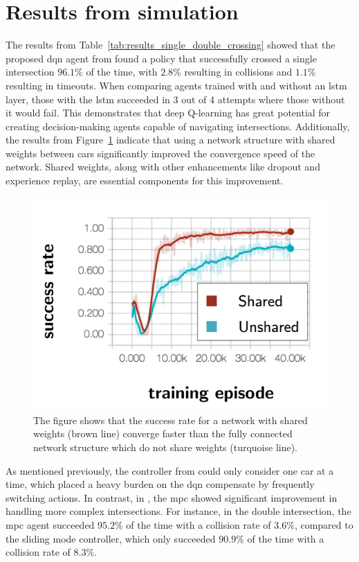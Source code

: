 \section{Results from simulation}
\label{sec:results_dqn}
The results from Table~\ref{tab:results_single_double_crossing} showed that the proposed \gls{dqn} agent from \paperLSTM found a policy that successfully crossed a single intersection $96.1\%$ of the time, with $2.8\%$ resulting in collisions and $1.1\%$ resulting in timeouts. 
When comparing agents trained with and without an \gls{lstm} layer, those with the \gls{lstm} succeeded in 3 out of 4 attempts where those without it would fail.
This demonstrates that deep Q-learning has great potential for creating decision-making agents capable of navigating intersections. Additionally, the results from Figure~\ref{fig:results_shared} indicate that using a network structure with shared weights between cars significantly improved the convergence speed of the network. Shared weights, along with other enhancements like dropout and experience replay, are essential components for this improvement.

\begin{figure}[!ht]
	\centering
	\includegraphics[width=0.7\columnwidth]{YourThesis/papers/lstm/figures/results_shared.png}
	\caption{The figure shows that the success rate for a network with shared weights (brown line) converge faster than the fully connected network structure which do not share weights (turquoise line).}
	\label{fig:results_shared}
\end{figure}

As mentioned previously, the controller from \paperLSTM could only consider one car at a time, which placed a heavy burden on the \gls{dqn} compensate by frequently switching actions. 
In contrast, in \paperMPC, the \gls{mpc} showed significant improvement in handling more complex intersections.
For instance, in the double intersection, the \gls{mpc} agent succeeded $95.2\%$ of the time with a collision rate of $3.6\%$, compared to the sliding mode controller, which only succeeded $90.9\%$ of the time with a collision rate of $8.3\%$.


